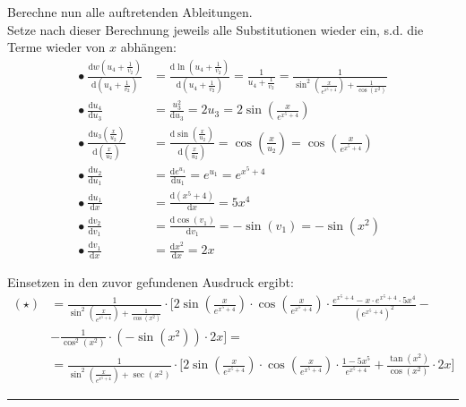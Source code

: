 \documentclass{article}
\newcommand{\diff}{\mathrm{d}}
\newcommand{\lr}[1]{\left(#1\right)}
\begin{document}
{	Berechne nun alle auftretenden Ableitungen.\\
	Setze nach dieser Berechnung jeweils alle Substitutionen wieder ein, s.d. die Terme wieder von $x$ abhängen:
		\begin{align*}
			\bullet \ \frac{\diff w \lr{ u_4 + \frac{1}{v_2} }}{\diff \lr{ u_4 + \frac{1}{v_2} }} &= \frac{\diff \ln \lr{ u_4 + \frac{1}{v_2} }}{\diff \lr{ u_4 + \frac{1}{v_2} }} = \frac{1}{u_4 + \frac{1}{v_2}} = \frac{1}{\sin^2\lr{ \frac{x}{e^{x^5+4}} } + \frac{1}{\cos(x^2)}} \\
			\bullet \ \frac{\diff u_4}{\diff u_3} &= \frac{u_3^2}{\diff u_3} = 2 u_3 = 2 \sin\lr{ \frac{x}{e^{x^5+4}} } \\
			\bullet \ \frac{\diff u_3 \lr{ \frac{x}{u_2} }}{\diff \lr{ \frac{x}{u_2} }} &= \frac{\diff \sin\lr{ \frac{x}{u_2} }}{\diff \lr{ \frac{x}{u_2} }} = \cos\lr{ \frac{x}{u_2} } = \cos\lr{ \frac{x}{e^{x^5+4}} } \\
			\bullet \ \frac{\diff u_2}{\diff u_1} &= \frac{\diff e^{u_1}}{\diff u_1} = e^{u_1} = e^{x^5+4} \\
			\bullet \ \frac{\diff u_1}{\diff x} &= \frac{\diff (x^5+4)}{\diff x} = 5x^4 \\
			\bullet \ \frac{\diff v_2}{\diff v_1} &= \frac{\diff \cos(v_1)}{\diff v_1} = -\sin(v_1) = -\sin(x^2) \\
			\bullet \ \frac{\diff v_1}{\diff x} &= \frac{\diff x^2}{\diff x} = 2x
		\end{align*}

	Einsetzen in den zuvor gefundenen Ausdruck ergibt:
		\begin{align*}
			(\star) &= \frac{1}{\sin^2\lr{ \frac{x}{e^{x^5+4}} } + \frac{1}{\cos(x^2)}} \cdot \Bigg[ 2\sin\lr{ \frac{x}{e^{x^5+4}} } \cdot \cos\lr{ \frac{x}{e^{x^5+4}} } \cdot \frac{e^{x^5+4} - x \cdot e^{x^5+4} \cdot 5x^4}{ \lr{e^{x^5+4}}^2 } - \\
			&- \frac{1}{\cos^2(x^2)} \cdot \lr{-\sin(x^2)} \cdot 2x \Bigg] = \\
			&= \frac{1}{\sin^2\lr{ \frac{x}{e^{x^5+4}} } + \sec(x^2)} \cdot \Bigg[ 2\sin\lr{ \frac{x}{e^{x^5+4}} } \cdot \cos\lr{ \frac{x}{e^{x^5+4}} } \cdot \frac{1 - 5x^5}{ e^{x^5+4} }  + \frac{\tan(x^2)}{\cos(x^2)} \cdot 2x \Bigg]
		\end{align*}
\hrule
}


\newpage
\end{document}
